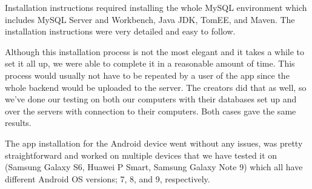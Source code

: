 \hspace{\parindent}Installation instructions required installing the whole MySQL environment which includes MySQL Server and Workbench, Java JDK, TomEE, and Maven. The installation instructions were very detailed and easy to follow. \newline

Although this installation process is not the most elegant and it takes a while to set it all up, we were able to complete it in a reasonable amount of time. This process would usually not have to be repeated by a user of the app since the whole backend would be uploaded to the server. The creators did that as well, so we've done our testing on both our computers with their databases set up and over the servers with connection to their computers. Both cases gave the same results.\newline

The app installation for the Android device went without any issues, was pretty straightforward and worked on multiple devices that we have tested it on (Samsung Galaxy S6, Huawei P Smart, Samsung Galaxy Note 9) which all have different Android OS versions; 7, 8, and 9, respectively. \newline


